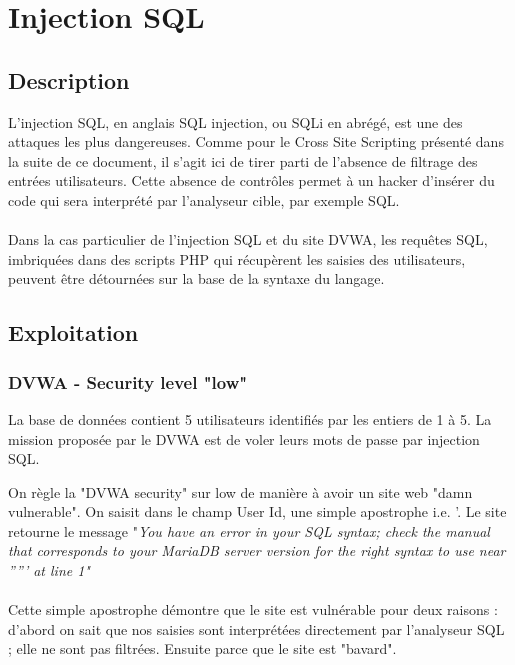 
\newpage
\section{Injection SQL }


\subsection{Description}
L'injection SQL, en anglais SQL  injection, ou SQLi en abrégé, est une des attaques les plus dangereuses. Comme pour le Cross Site Scripting présenté dans la suite de ce document, il s'agit ici de tirer parti de l'absence de filtrage des entrées utilisateurs. Cette absence de contrôles permet à un hacker d'insérer du code qui sera interprété par l'analyseur cible, par exemple SQL.

\paragraph{}
Dans la cas particulier de l'injection SQL et du site DVWA, les requêtes SQL, imbriquées dans des scripts PHP qui récupèrent les saisies des utilisateurs, peuvent être détournées sur la base de la syntaxe du langage. 




\subsection{Exploitation}

\subsubsection{DVWA - Security level "low"}

La base de données contient 5 utilisateurs identifiés par les entiers de 1 à 5.
La mission proposée par le DVWA est de voler leurs mots de passe par injection SQL.

On règle la "DVWA security" sur low de manière à avoir un site web "damn vulnerable".
On saisit dans le champ User Id, une simple apostrophe i.e. '. Le site retourne le message
"\it {You have an error in your SQL syntax; check the manual that corresponds to your MariaDB server version for the right syntax to use near ''''' at line 1}"

\paragraph{}Cette simple apostrophe démontre que le site est vulnérable pour deux raisons : d'abord on sait que nos saisies sont interprétées directement par l'analyseur SQL ; elle ne sont pas filtrées. Ensuite parce que le site est "bavard".

